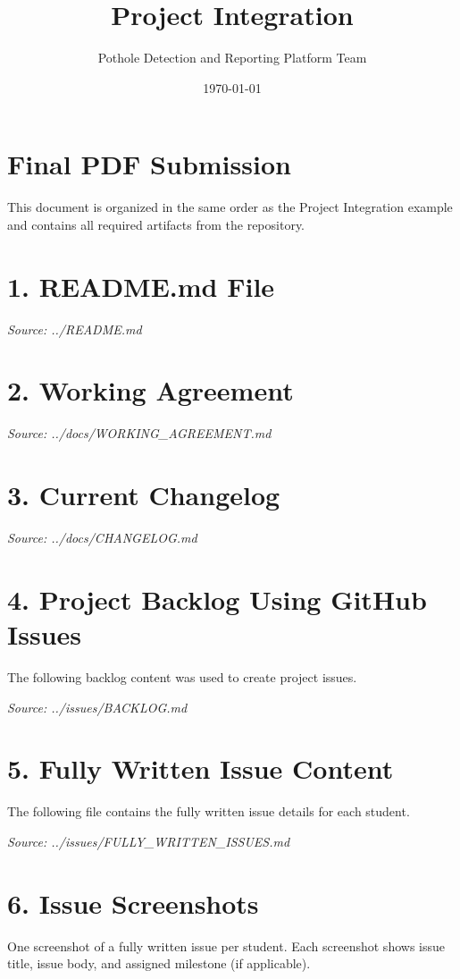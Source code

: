 ﻿\documentclass[11pt]{article}
\title{Project Integration}
\author{Pothole Detection and Reporting Platform Team}
\date{\today}
\begin{document}
\maketitle
\tableofcontents
\newpage

\section{Final PDF Submission}
This document is organized in the same order as the Project Integration example and contains all required artifacts from the repository.

\newpage
\section{1. README.md File}
\textit{Source: ../README.md}

\newpage
\section{2. Working Agreement}
\textit{Source: ../docs/WORKING\_AGREEMENT.md}

\newpage
\section{3. Current Changelog}
\textit{Source: ../docs/CHANGELOG.md}

\newpage
\section{4. Project Backlog Using GitHub Issues}
The following backlog content was used to create project issues.

\textit{Source: ../issues/BACKLOG.md}

\newpage
\section{5. Fully Written Issue Content}
The following file contains the fully written issue details for each student.

\textit{Source: ../issues/FULLY\_WRITTEN\_ISSUES.md}

\newpage
\section{6. Issue Screenshots}
One screenshot of a fully written issue per student. Each screenshot shows issue title, issue body, and assigned milestone (if applicable).
\end{document}
